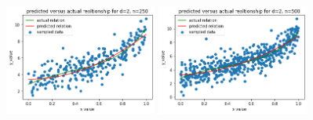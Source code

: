 \documentclass{article}
\begin{document}
\begin{enumerate}
\begin{itemize}
             \includegraphics[width=5cm]{homework/homework_1/d_2_2.png}
            \includegraphics[width=5cm]{homework/homework_1/d_2_3.png}
            

\end{itemize}
\end{enumerate}
\end{document}
